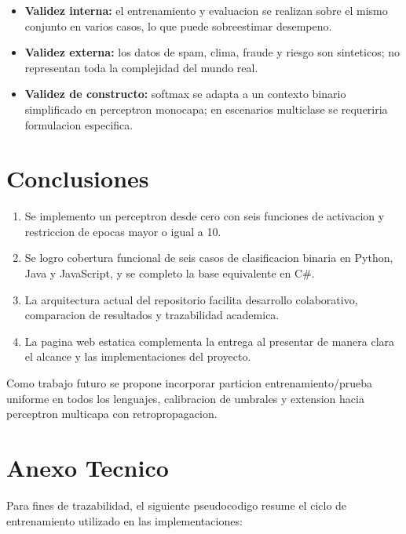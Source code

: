 \documentclass[10pt,twocolumn,a4paper]{article}
\begin{document}
\begin{itemize}
  \item \textbf{Validez interna:} el entrenamiento y evaluacion se
  realizan sobre el mismo conjunto en varios casos, lo que puede
  sobreestimar desempeno.
  \item \textbf{Validez externa:} los datos de spam, clima, fraude y
  riesgo son sinteticos; no representan toda la complejidad del mundo
  real.
  \item \textbf{Validez de constructo:} softmax se adapta a un
  contexto binario simplificado en perceptron monocapa; en escenarios
  multiclase se requeriria formulacion especifica.
\end{itemize}

\section{Conclusiones}

\begin{enumerate}
  \item Se implemento un perceptron desde cero con seis funciones de
  activacion y restriccion de epocas mayor o igual a 10.
  \item Se logro cobertura funcional de seis casos de clasificacion
  binaria en Python, Java y JavaScript, y se completo la base
  equivalente en C\#.
  \item La arquitectura actual del repositorio facilita desarrollo
  colaborativo, comparacion de resultados y trazabilidad academica.
  \item La pagina web estatica complementa la entrega al presentar de
  manera clara el alcance y las implementaciones del proyecto.
\end{enumerate}

Como trabajo futuro se propone incorporar particion entrenamiento/prueba
uniforme en todos los lenguajes, calibracion de umbrales y extension
hacia perceptron multicapa con retropropagacion.

\section*{Anexo Tecnico}

Para fines de trazabilidad, el siguiente pseudocodigo resume el ciclo
de entrenamiento utilizado en las implementaciones:
\end{document}

